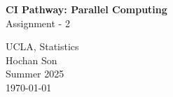 \documentclass[11pt]{article}
\begin{document}





\newif\ifuselocaldir
\uselocaldirtrue
\uselocaldirfalse


\newcommand{\DXZ}{
\begin{flushright}
\vspace{-.4in}
 { \raisebox{0.30ex}{{\tiny D}}\hspace{0.008in}X\hspace{0.01in}\raisebox{0.30ex}{{\tiny Z}}     }
\end{flushright}
}


\newenvironment{myQuote}[2]%
               {\begin{list}{}{\leftmargin#1\rightmargin#2}\item{}}%
               {\end{list}}

\begin{myQuote}{2cm}{2cm}
\begin{center}
{\huge
\textbf{CI Pathway: Parallel Computing} \\[0.4cm]
Assignment - 2
} \\[0.4cm]
\end{center}
\end{myQuote}




\begin{myQuote}{3cm}{3cm}
{\normalsize
\begin{center}
UCLA, Statistics\\Hochan Son\\Summer 2025\\
\today
\end{center}
}
\end{myQuote}


\end{document}
